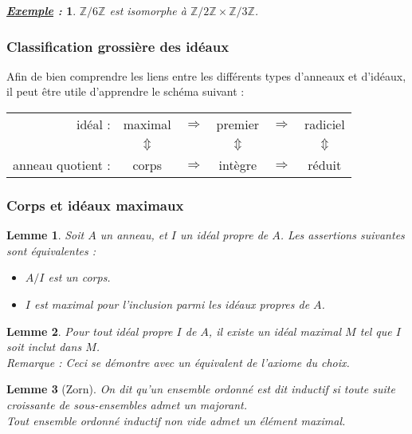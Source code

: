 \documentclass{article}           %
\newcommand\Z{\mathbb{Z}}
\theoremstyle{break}
\theoremstyle{add}
\theoremstyle{break} %
\newtheorem{lemme}{Lemme}[section]
\theoremstyle{add}
\newtheorem*{exemple}{\textit{\underline{Exemple} :}}
\begin{document}
\begin{exemple}
$\Z/6 \Z$ est isomorphe à $\Z/2 \Z \times \Z/3 \Z$. 
\end{exemple}

\subsubsection{Classification grossière des idéaux}

Afin de bien comprendre les liens entre les différents types d'anneaux et d'idéaux, il peut être utile d'apprendre le schéma suivant : \\

 \begin{tabular}{rccccc}
idéal : & maximal & $\Longrightarrow$ & premier & $\Longrightarrow$ & radiciel \\
& $\Updownarrow$ &&  $\Updownarrow$  && $\Updownarrow$  \\ 
anneau quotient : & corps & $\Longrightarrow$ & intègre & $\Longrightarrow$ & réduit \\
\end{tabular}

\subsubsection{Corps et idéaux maximaux}

\begin{lemme}
Soit $A$ un anneau,  et $I$ un idéal propre de $A$. Les assertions suivantes sont équivalentes :
\begin{itemize}
\item $A/I$ est un corps.
\item $I$ est maximal pour l'inclusion parmi les idéaux propres de $A$.
\end{itemize}
\end{lemme}

\begin{lemme}
Pour tout idéal propre $I$ de $A$, il existe un idéal maximal $M$ tel que $I$ soit inclut dans $M$.\\

\textit{Remarque :} Ceci se démontre avec un équivalent de l'axiome du choix.
\end{lemme}


\begin{lemme}[Zorn]
On dit qu'un ensemble ordonné est dit \textit{inductif} si toute suite croissante de sous-ensembles admet un majorant.\\

Tout ensemble ordonné inductif non vide admet un élément maximal.
\end{lemme}
\end{document}
